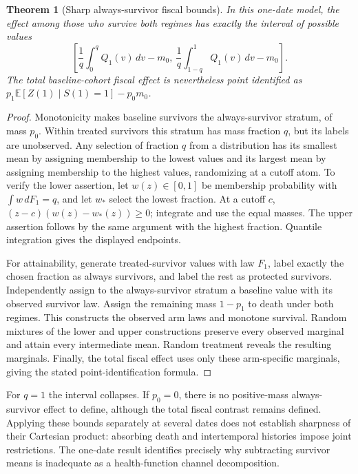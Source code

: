 \documentclass[11pt]{article}
\newtheorem{theorem}{Theorem}
\theoremstyle{remark}
\newcommand{\E}{\mathbb E}
\begin{document}
\begin{theorem}[Sharp always-survivor fiscal bounds]\label{trim}
In this one-date model, the effect among those who survive both regimes has exactly the interval of possible values
\[
 \left[\frac1q\int_0^qQ_1(v)\,dv-m_0,
       \ \frac1q\int_{1-q}^1Q_1(v)\,dv-m_0\right].
\]
The total baseline-cohort fiscal effect is nevertheless point identified as
$p_1\E[Z(1)\mid S(1)=1]-p_0m_0$.
\end{theorem}
\begin{proof}
Monotonicity makes baseline survivors the always-survivor stratum, of mass $p_0$. Within treated survivors this stratum has mass fraction $q$, but its labels are unobserved. Any selection of fraction $q$ from a distribution has its smallest mean by assigning membership to the lowest values and its largest mean by assigning membership to the highest values, randomizing at a cutoff atom. To verify the lower assertion, let $w(z)\in[0,1]$ be membership probability with $\int w\,dF_1=q$, and let $w_*$ select the lowest fraction. At a cutoff $c$, $(z-c)(w(z)-w_*(z))\geq0$; integrate and use the equal masses. The upper assertion follows by the same argument with the highest fraction. Quantile integration gives the displayed endpoints.

For attainability, generate treated-survivor values with law $F_1$, label exactly the chosen fraction as always survivors, and label the rest as protected survivors. Independently assign to the always-survivor stratum a baseline value with its observed survivor law. Assign the remaining mass $1-p_1$ to death under both regimes. This constructs the observed arm laws and monotone survival. Random mixtures of the lower and upper constructions preserve every observed marginal and attain every intermediate mean. Random treatment reveals the resulting marginals. Finally, the total fiscal effect uses only these arm-specific marginals, giving the stated point-identification formula.
\end{proof}

For $q=1$ the interval collapses. If $p_0=0$, there is no positive-mass always-survivor effect to define, although the total fiscal contrast remains defined. Applying these bounds separately at several dates does not establish sharpness of their Cartesian product: absorbing death and intertemporal histories impose joint restrictions. The one-date result identifies precisely why subtracting survivor means is inadequate as a health-function channel decomposition.
\end{document}
